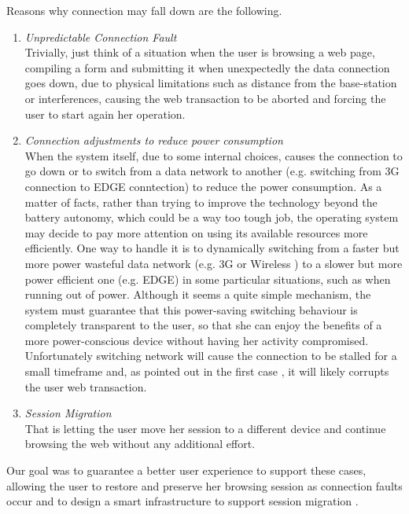 \documentclass[11pt,a4paper]{article}
\begin{document}
Reasons why connection may fall down are the following.\\
\begin{enumerate}
\item \emph{Unpredictable Connection Fault} \\
	Trivially, just think of a situation when the user is browsing a web page, compiling a form and submitting it when unexpectedly the data connection goes down, due to physical 	limitations such as distance from the base-station or interferences, causing the web 	transaction to be aborted and forcing the user to start again her operation.
\item \emph{Connection adjustments to reduce power consumption} \\
	When the system itself, due to some internal choices, causes the connection to go down or to switch from a data network to another (e.g. switching from 3G connection to EDGE conntection) to reduce the power consumption. 
	As a matter of facts, rather than trying to improve the technology beyond the battery autonomy, which could be a way too tough job, the operating system may decide to pay more attention on using its available resources more efficiently. One way to handle it is to dynamically switching from a faster but more power wasteful data network (e.g. 3G or Wireless )  to a slower but more power efficient one (e.g. EDGE) in some particular situations, such as when running out of power.
	Although it seems a quite simple mechanism, the system must guarantee that this power-saving switching behaviour is completely transparent to the user, so that she can enjoy the benefits of a more power-conscious device without having her activity compromised. Unfortunately switching network will cause the connection to be stalled for a small timeframe and, as pointed out in the first case , it will likely corrupts the user web transaction.
\item \emph{Session Migration}\\
	That is letting the user move her session to a different device and continue browsing the web without any additional effort.
\end{enumerate}
Our goal was to guarantee a better user experience to support these cases, allowing the user to restore and preserve her browsing session as connection faults occur and to design a smart infrastructure to support session migration .
\end{document}
